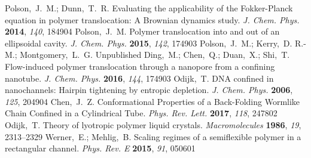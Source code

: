 \documentclass[journal=mamobx,manuscript=article,layout=twocolumn]{achemso}
\begin{document}
\begin{mcitethebibliography}{52}
Polson,~J.~M.; Dunn,~T.~R. Evaluating the applicability of the Fokker-Planck
  equation in polymer translocation: A Brownian dynamics study. \emph{J. Chem.
  Phys.} \textbf{2014}, \emph{140}, 184904\relax
\mciteBstWouldAddEndPuncttrue
\mciteSetBstMidEndSepPunct{\mcitedefaultmidpunct}
{\mcitedefaultendpunct}{\mcitedefaultseppunct}\relax
\EndOfBibitem
{}
Polson,~J.~M. Polymer translocation into and out of an ellipsoidal cavity.
  \emph{J. Chem. Phys.} \textbf{2015}, \emph{142}, 174903\relax
\mciteBstWouldAddEndPuncttrue
\mciteSetBstMidEndSepPunct{\mcitedefaultmidpunct}
{\mcitedefaultendpunct}{\mcitedefaultseppunct}\relax
\EndOfBibitem
{}
Polson,~J.~M.; Kerry,~D. R.-M.; Montgomery,~L.~G. Unpublished\relax
\mciteBstWouldAddEndPuncttrue
\mciteSetBstMidEndSepPunct{\mcitedefaultmidpunct}
{\mcitedefaultendpunct}{\mcitedefaultseppunct}\relax
\EndOfBibitem
{}
Ding,~M.; Chen,~Q.; Duan,~X.; Shi,~T. Flow-induced polymer translocation
  through a nanopore from a confining nanotube. \emph{J. Chem. Phys.}
  \textbf{2016}, \emph{144}, 174903\relax
\mciteBstWouldAddEndPuncttrue
\mciteSetBstMidEndSepPunct{\mcitedefaultmidpunct}
{\mcitedefaultendpunct}{\mcitedefaultseppunct}\relax
\EndOfBibitem
{}
Odijk,~T. DNA confined in nanochannels: Hairpin tightening by entropic
  depletion. \emph{J. Chem. Phys.} \textbf{2006}, \emph{125}, 204904\relax
\mciteBstWouldAddEndPuncttrue
\mciteSetBstMidEndSepPunct{\mcitedefaultmidpunct}
{\mcitedefaultendpunct}{\mcitedefaultseppunct}\relax
\EndOfBibitem
{}
Chen,~J.~Z. Conformational Properties of a Back-Folding Wormlike Chain Confined
  in a Cylindrical Tube. \emph{Phys. Rev. Lett.} \textbf{2017}, \emph{118},
  247802\relax
\mciteBstWouldAddEndPuncttrue
\mciteSetBstMidEndSepPunct{\mcitedefaultmidpunct}
{\mcitedefaultendpunct}{\mcitedefaultseppunct}\relax
\EndOfBibitem
{}
Odijk,~T. Theory of lyotropic polymer liquid crystals. \emph{Macromolecules}
  \textbf{1986}, \emph{19}, 2313--2329\relax
\mciteBstWouldAddEndPuncttrue
\mciteSetBstMidEndSepPunct{\mcitedefaultmidpunct}
{\mcitedefaultendpunct}{\mcitedefaultseppunct}\relax
\EndOfBibitem
{}
Werner,~E.; Mehlig,~B. Scaling regimes of a semiflexible polymer in a
  rectangular channel. \emph{Phys. Rev. E} \textbf{2015}, \emph{91},
  050601\relax
\mciteBstWouldAddEndPuncttrue
\mciteSetBstMidEndSepPunct{\mcitedefaultmidpunct}
{\mcitedefaultendpunct}{\mcitedefaultseppunct}\relax
\EndOfBibitem
\end{mcitethebibliography}
\end{document}
